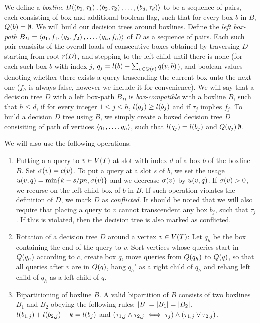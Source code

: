 We define a \textit{boxline} $B\mathopen{}\langle \mathopen{}\left( b_1, \tau_1 \right),\mathopen{}\left( b_2, \tau_2 \right),\dots, \mathopen{}\left( b_d, \tau_d \right) \rangle$ to be a sequence of pairs, each consisting of box and additional boolean flag, such that for every box $b$ in $B$, $Q\mathopen{}\left( b \right)=\emptyset$. We will build our decision trees around boxlines. Define the \textit{left box-path} $B_D=\mathopen{}\langle {q_1, f_1},\mathopen{}\left( q_2, f_2 \right),\dots, \mathopen{}\left( q_h, f_h \right) \rangle$ of $D$ as a sequence of pairs. Each such pair consisits of the overall loads of consecutive boxes obtained by traversing $D$ starting from root $r\mathopen{}\left( D \right)$, and stepping to the left child until there is none (for each such box $b$ with index $j$, $q_j=l\mathopen{}\left( b \right)+\sum_{v\in Q\mathopen{}\left( b \right)}q\mathopen{}\left( v, b \right)$), and boolean values denoting whether there exists a query trascending the current box unto the next one ($f_h$ is always false, however we include it for convenience). We will say that a decision tree $D$ with a left box-path $B_D$ is \textit{box-compatible} with a boxline $B$, such that $h\leq d$, if for every integer $1\leq j \leq h$, $l\mathopen{}\left( q_j \right)\geq l\mathopen{}\left( b_j \right)$ and if $\tau_j$ implies $f_j$. To build a decision $D$ tree using $B$, we simply create a boxed decision tree $D$ consisiting of path of vertices $\mathopen{}\langle q_1,\dots, q_h \rangle$, such that $l\mathopen{}\left( q_j \right)=l\mathopen{}\left( b_j \right)$ and $Q\mathopen{}\left( q_j \right)\emptyset$.

We will also use the following operations: 
\begin{enumerate}
    \item Putting a a query to $v\in V\mathopen{}\left( T \right)$ at slot with index $d$ of a box $b$ of the boxline $B$. Set $\sigma\mathopen{}\left( v \right)=c\mathopen{}\left( v \right)$. To put a query at a slot $s$ of $b$, we set the usage $u\mathopen{}\left( v, q \right)=\min\mathopen{}\left\{ k-s/pn, \sigma\mathopen{}\left( v \right) \right\}$ and we decrease $\sigma\mathopen{}\left( v \right)$ by $u\mathopen{}\left( v, q \right)$. If $\sigma\mathopen{}\left( v \right)>0$, we recurse on the left child box of $b$ in $B$. If such operation violates the definition of $D$, we mark $D$ as \textit{conflicted}. It should be noted that we will also require that placing a query to $v$ cannot transcendent any box $b_j$, such that $\tau_j$. If this is violated, then the decision tree is also marked as conflicted. 
    \item Rotation of a decision tree $D$ around a vertex $v\in V\mathopen{}\left( T \right)$: Let $q_h$ be the box containing the end of the query to $v$. Sort vertices whose queries start in $Q\mathopen{}\left( q_h \right)$ according to $c$, create box $q$, move queries from $Q\mathopen{}\left( q_h \right)$ to $Q\mathopen{}\left( q \right)$, so that all queries after $v$ are in $Q\mathopen{}\left( q \right)$, hang $q_h'$ as a right child of $q_h$ and rehang left child of $q_h$ as a left child of $q$.
    \item Bipartitioning of boxline $B$. A valid bipartition of $B$ consists of two boxlines $B_1$ and $B_2$ obeying the following rules: $\mathopen{}\left| B \right|=\mathopen{}\left| B_1 \right|=\mathopen{}\left| B_2 \right|$, $l\mathopen{}\left( b_{1,j} \right)+l\mathopen{}\left( b_{2,j} \right) - k = l\mathopen{}\left( b_j \right)$ and $\mathopen{}\left( \tau_{1,j}\land \tau_{2,j} \iff \tau_{j} \right)\land \mathopen{}\left( \tau_{1,j}\lor \tau_{2,j} \right)$.
\end{enumerate}

